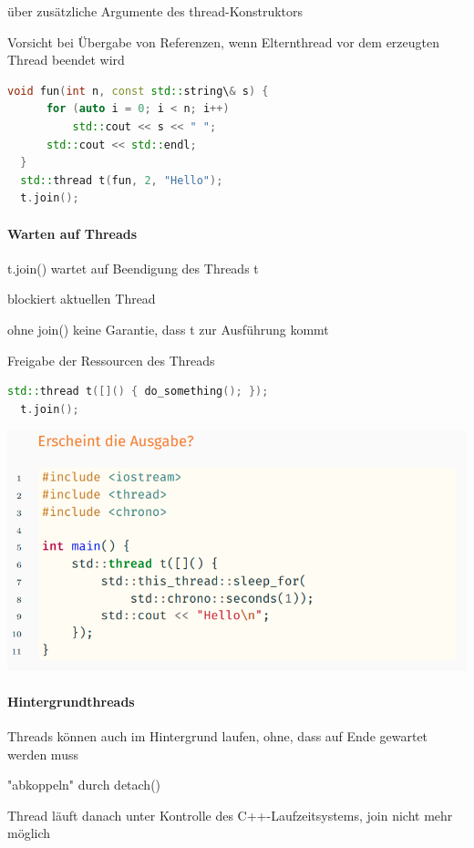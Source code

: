 \documentclass[10pt]{article}
\begin{document}
  \begin{itemize*}
    \item über zusätzliche Argumente des thread-Konstruktors
    \item Vorsicht bei Übergabe von Referenzen, wenn Elternthread vor dem erzeugten Thread beendet wird
  \end{itemize*}
  \begin{lstlisting}[language=C++]
  void fun(int n, const std::string\& s) {
      for (auto i = 0; i < n; i++)
          std::cout << s << " ";
      std::cout << std::endl;
  }
  std::thread t(fun, 2, "Hello");
  t.join();
  \end{lstlisting}
  
  \paragraph{Warten auf Threads}
  
  \begin{itemize*}
    \item t.join() wartet auf Beendigung des Threads t
    \item blockiert aktuellen Thread
    \item ohne join() keine Garantie, dass t zur Ausführung kommt
    \item Freigabe der Ressourcen des Threads
  \end{itemize*}
  \begin{lstlisting}[language=C++]
  std::thread t([]() { do_something(); });
  t.join();
  \end{lstlisting}
  \begin{center}
    \includegraphics[width=0.4\linewidth]{Assets/Programmierparadigmen-code-snippet-16}
  \end{center}
  
  \paragraph{Hintergrundthreads}
  
  \begin{itemize*}
    \item Threads können auch im Hintergrund laufen, ohne, dass auf Ende gewartet werden muss
    \item "abkoppeln" durch detach()
    \item Thread läuft danach unter Kontrolle des C++-Laufzeitsystems, join nicht mehr möglich
  \end{itemize*}
  
\end{document}
